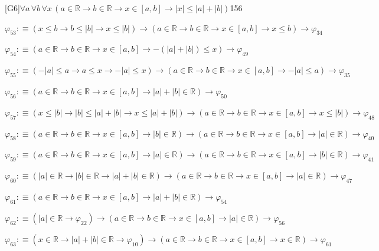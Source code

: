 \begin{fullproof}{[G6]}{$\forall a\,\forall b\,\forall x\,(a \in \mathbb{R} \to b \in \mathbb{R} \to x \in [a,b] \to \lvert x \rvert \leq \lvert a \rvert + \lvert b \rvert)$}{156}
\begin{abbrevlist}
\item $\varphi_{53} :\equiv (x \leq b \to b \leq \lvert b \rvert \to x \leq \lvert b \rvert) \to (a \in \mathbb{R} \to b \in \mathbb{R} \to x \in [a,b] \to x \leq b) \to \varphi_{34}$
\item $\varphi_{54} :\equiv (a \in \mathbb{R} \to b \in \mathbb{R} \to x \in [a,b] \to -(\lvert a \rvert + \lvert b \rvert) \leq x) \to \varphi_{49}$
\item $\varphi_{55} :\equiv (-\lvert a \rvert \leq a \to a \leq x \to -\lvert a \rvert \leq x) \to (a \in \mathbb{R} \to b \in \mathbb{R} \to x \in [a,b] \to -\lvert a \rvert \leq a) \to \varphi_{35}$
\item $\varphi_{56} :\equiv (a \in \mathbb{R} \to b \in \mathbb{R} \to x \in [a,b] \to \lvert a \rvert + \lvert b \rvert \in \mathbb{R}) \to \varphi_{50}$
\item $\varphi_{57} :\equiv (x \leq \lvert b \rvert \to \lvert b \rvert \leq \lvert a \rvert + \lvert b \rvert \to x \leq \lvert a \rvert + \lvert b \rvert) \to (a \in \mathbb{R} \to b \in \mathbb{R} \to x \in [a,b] \to x \leq \lvert b \rvert) \to \varphi_{48}$
\item $\varphi_{58} :\equiv (a \in \mathbb{R} \to b \in \mathbb{R} \to x \in [a,b] \to \lvert b \rvert \in \mathbb{R}) \to (a \in \mathbb{R} \to b \in \mathbb{R} \to x \in [a,b] \to \lvert a \rvert \in \mathbb{R}) \to \varphi_{40}$
\item $\varphi_{59} :\equiv (a \in \mathbb{R} \to b \in \mathbb{R} \to x \in [a,b] \to \lvert a \rvert \in \mathbb{R}) \to (a \in \mathbb{R} \to b \in \mathbb{R} \to x \in [a,b] \to \lvert b \rvert \in \mathbb{R}) \to \varphi_{41}$
\item $\varphi_{60} :\equiv (\lvert a \rvert \in \mathbb{R} \to \lvert b \rvert \in \mathbb{R} \to \lvert a \rvert + \lvert b \rvert \in \mathbb{R}) \to (a \in \mathbb{R} \to b \in \mathbb{R} \to x \in [a,b] \to \lvert a \rvert \in \mathbb{R}) \to \varphi_{47}$
\item $\varphi_{61} :\equiv (a \in \mathbb{R} \to b \in \mathbb{R} \to x \in [a,b] \to \lvert a \rvert + \lvert b \rvert \in \mathbb{R}) \to \varphi_{54}$
\item $\varphi_{62} :\equiv (\lvert a \rvert \in \mathbb{R} \to \varphi_{22}) \to (a \in \mathbb{R} \to b \in \mathbb{R} \to x \in [a,b] \to \lvert a \rvert \in \mathbb{R}) \to \varphi_{56}$
\item $\varphi_{63} :\equiv (x \in \mathbb{R} \to \lvert a \rvert + \lvert b \rvert \in \mathbb{R} \to \varphi_{10}) \to (a \in \mathbb{R} \to b \in \mathbb{R} \to x \in [a,b] \to x \in \mathbb{R}) \to \varphi_{61}$
\end{abbrevlist}
\end{fullproof}
